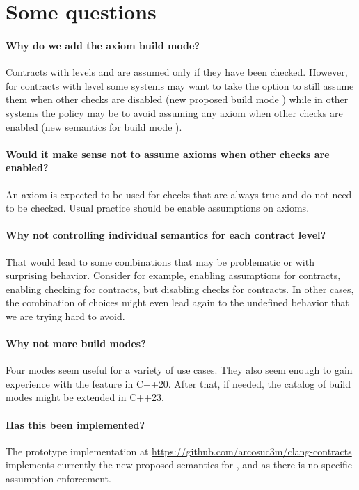 \section{Some questions}

\paragraph{Why do we add the axiom build mode?}
Contracts with levels  and  are assumed only
if they have been checked. However, for contracts with level 
some systems may want to take the option to still assume them when other checks
are disabled (new proposed build mode ) while in other
systems the policy may be to avoid assuming any axiom when other checks are
enabled (new semantics for build mode ).

\paragraph{Would it make sense not to assume axioms when other checks are
enabled?}
An axiom is expected to be used for checks that are always true and do not need to
be checked. Usual practice should be enable assumptions on axioms.

\paragraph{Why not controlling individual semantics for each contract level?}
That would lead to some combinations that may be problematic or with surprising
behavior. Consider for example, enabling assumptions for  contracts, enabling
checking for  contracts, but disabling checks for 
contracts. In other cases, the combination of choices might even lead again to
the undefined behavior that we are trying hard to avoid.

\paragraph{Why not more build modes?}
Four modes seem useful for a variety of use cases. They also seem enough to gain
experience with the feature in C++20. After that, if needed, the catalog of
build modes might be extended in C++23.

\paragraph{Has this been implemented?}
The prototype implementation at
\url{https://github.com/arcosuc3m/clang-contracts} implements currently the new
proposed semantics for ,  and  as there
is no specific assumption enforcement.

